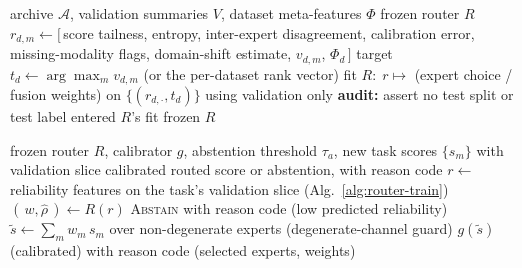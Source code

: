 \begin{algorithm}[t]
\caption{Validation-Only Reliability Router Training}
\label{alg:router-train}
\begin{algorithmic}[1]
\Require archive $\mathcal{A}$, validation summaries $V$, dataset meta-features $\Phi$
\Ensure frozen router $R$
  \State $r_{d,m} \gets [\,$score tailness, entropy, inter-expert disagreement, calibration error,
  \Statex \hspace{2.2em} missing-modality flags, domain-shift estimate, $v_{d,m}$, $\Phi_d\,]$ 
\EndFor
\State target $t_d \gets \arg\max_m v_{d,m}$ (or the per-dataset rank vector)
\State fit $R:\; r \mapsto$ (expert choice / fusion weights) on $\{(r_{d,\cdot}, t_d)\}$ using validation only
\State \textbf{audit:} assert no test split or test label entered $R$'s fit
\State \Return frozen $R$
\end{algorithmic}
\end{algorithm}

\begin{algorithm}[t]
\caption{Routed Inference With Abstention}
\label{alg:route-infer}
\begin{algorithmic}[1]
\Require frozen router $R$, calibrator $g$, abstention threshold $\tau_a$, new task scores $\{s_m\}$ with validation slice
\Ensure calibrated routed score or abstention, with reason code
\State $r \gets$ reliability features on the task's validation slice (Alg.~\ref{alg:router-train})
\State $(\,w, \hat{\rho}\,) \gets R(r)$ 
  \State \Return \textsc{Abstain} with reason code (low predicted reliability)
\EndIf
\State $\tilde{s} \gets \sum_m w_m\, s_m$ over non-degenerate experts (degenerate-channel guard)
\State \Return $g(\tilde{s})$ (calibrated) with reason code (selected experts, weights)
\end{algorithmic}
\end{algorithm}

